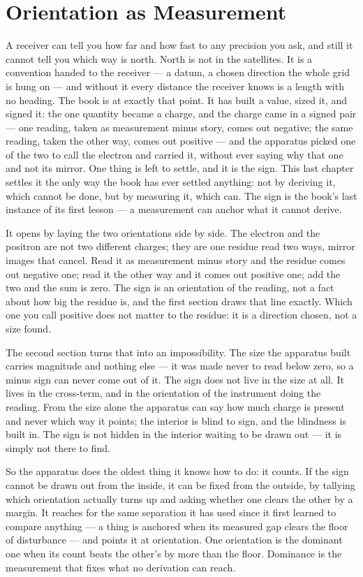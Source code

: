 \chapter{Orientation as Measurement}

A receiver can tell you how far and how fast to any precision you ask, and still it cannot tell you which way is north. North is not in the satellites. It is a convention handed to the receiver --- a datum, a chosen direction the whole grid is hung on --- and without it every distance the receiver knows is a length with no heading. The book is at exactly that point. It has built a value, sized it, and signed it: the one quantity became a charge, and the charge came in a signed pair --- one reading, taken as measurement minus story, comes out negative; the same reading, taken the other way, comes out positive --- and the apparatus picked one of the two to call the electron and carried it, without ever saying why that one and not its mirror. One thing is left to settle, and it is the sign. This last chapter settles it the only way the book has ever settled anything: not by deriving it, which cannot be done, but by measuring it, which can. The sign is the book's last instance of its first lesson --- a measurement can anchor what it cannot derive.

It opens by laying the two orientations side by side. The electron and the positron are not two different charges; they are one residue read two ways, mirror images that cancel. Read it as measurement minus story and the residue comes out negative one; read it the other way and it comes out positive one; add the two and the sum is zero. The sign is an orientation of the reading, not a fact about how big the residue is, and the first section draws that line exactly. Which one you call positive does not matter to the residue: it is a direction chosen, not a size found.

The second section turns that into an impossibility. The size the apparatus built carries magnitude and nothing else --- it was made never to read below zero, so a minus sign can never come out of it. The sign does not live in the size at all. It lives in the cross-term, and in the orientation of the instrument doing the reading. From the size alone the apparatus can say how much charge is present and never which way it points; the interior is blind to sign, and the blindness is built in. The sign is not hidden in the interior waiting to be drawn out --- it is simply not there to find.

So the apparatus does the oldest thing it knows how to do: it counts. If the sign cannot be drawn out from the inside, it can be fixed from the outside, by tallying which orientation actually turns up and asking whether one clears the other by a margin. It reaches for the same separation it has used since it first learned to compare anything --- a thing is anchored when its measured gap clears the floor of disturbance --- and points it at orientation. One orientation is the dominant one when its count beats the other's by more than the floor. Dominance is the measurement that fixes what no derivation can reach.

